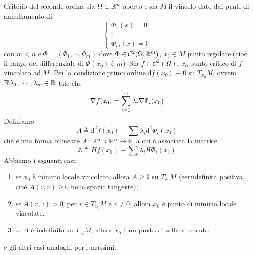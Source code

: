 \documentclass[a4paper]{article}
\begin{document}
\begin{snippettheorem}{Criterio del secondo ordine}
    sia \(\Omega \subset \mathbb{R}^n\) aperto e sia
    \(M\) il vincolo dato dai punti di annullamento di \[
        \begin{cases}
            \Phi_1(x) = 0 \\
            \vdots \\
            \Phi_m(x) = 0
        \end{cases}
    \]
    con \(m < n\) e \(\Phi = (\Phi_1, \cdots, \Phi_m)\)
    dove \(\Phi \in \mathcal{C}^2(\Omega, \mathbb{R}^m)\), \(x_0 \in M\)
    punto regolare (cioè il rango del differenziale di \(\Phi(x_0)\) è \(m\)).
    Sia \(f \in \mathcal{C}^2(\Omega)\), \(x_0\) punto critico di \(f\) vincolato 
    ad \(M\). Per la condizione primo ordine
    \(\text{d}f(x_0) \equiv 0\) su \(T_{x_0}M\), ovvero
    \(\exists ! \lambda_1, \cdots, \lambda_m \in \mathbb{R}\)
    tale che 
    \[
        \nabla f(x_0) = \sum_{i=1}^m \lambda_i \nabla \Phi_i(x_0)
    \]
    Definiamo
    \[
        A \triangleq \text{d}^2 f(x_0) - \sum \lambda_i \text{d}^2 \Phi_i(x_0)
    \]
    che è una forma bilineare \(A \colon \mathbb{R}^n \times \mathbb{R}^n \to \mathbb{R}\)
    a cui è associata la matrice
    \[
        \mathbb{A} \triangleq Hf(x_0) - \sum \lambda_i H\Phi_i(x_0)
    \]
    Abbiamo i seguenti casi:
    \begin{enumerate}
        \item se \(x_0\) è minimo locale vincolato, allora \(A \geq 0\) su \(T_{x_0}M\)
        (semidefinita positiva, cioè \(A(v,v) \geq 0\) nello spazio tangente);
        \item se \(A(v,v) > 0\), per \(v \in T_{x_0}M\) e \(v\neq 0\), allora \(x_0\)
        è punto di minimo locale vincolato.
        \item se \(A\) è indefinito su \(T_{x_0}M\), allora \(x_0\) è un punto di sella vincolato.
    \end{enumerate}
    e gli altri casi analoghi per i massimi.
\end{snippettheorem}
\end{document}
